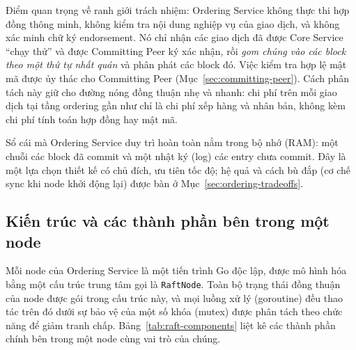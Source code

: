 Điểm quan trọng về ranh giới trách nhiệm: Ordering Service không thực thi
hợp đồng thông minh, không kiểm tra nội dung nghiệp vụ của giao dịch, và
không xác minh chữ ký endorsement. Nó chỉ nhận các giao dịch đã được Core
Service ``chạy thử'' và được Committing Peer ký xác nhận, rồi \textit{gom chúng vào
các block theo một thứ tự nhất quán} và phân phát các block đó. Việc kiểm tra hợp
lệ mật mã được ủy thác cho Committing Peer (Mục~\ref{sec:committing-peer}). Cách
phân tách này giữ cho đường nóng đồng thuận nhẹ và nhanh: chi phí trên mỗi giao
dịch tại tầng ordering gần như chỉ là chi phí xếp hàng và nhân bản, không kèm chi
phí tính toán hợp đồng hay mật mã.

Sổ cái mà Ordering Service duy trì hoàn toàn nằm trong bộ nhớ (RAM): một chuỗi các
block đã commit và một nhật ký (log) các entry chưa commit. Đây là một lựa chọn
thiết kế có chủ đích, ưu tiên tốc độ; hệ quả và cách bù đắp (cơ chế sync khi node
khởi động lại) được bàn ở Mục~\ref{sec:ordering-tradeoffs}.

\subsection{Kiến trúc và các thành phần bên trong một node}
\label{sec:ordering-components}

Mỗi node của Ordering Service là một tiến trình Go độc lập, được mô hình hóa bằng
một cấu trúc trung tâm gọi là \texttt{RaftNode}. Toàn bộ trạng thái đồng thuận của
node được gói trong cấu trúc này, và mọi luồng xử lý (goroutine) đều thao tác trên
đó dưới sự bảo vệ của một số khóa (mutex) được phân tách theo chức năng để giảm
tranh chấp. Bảng~\ref{tab:raft-components} liệt kê các thành phần chính bên trong
một node cùng vai trò của chúng.

